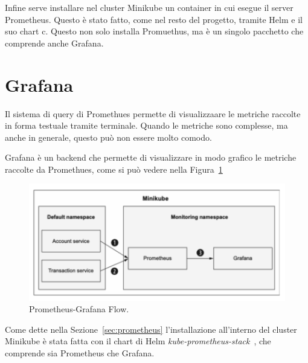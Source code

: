 Infine serve installare nel cluster Minikube un container in cui esegue il server Prometheus. Questo è stato fatto, come nel resto del progetto, tramite Helm e il suo chart c. Questo non solo installa Promuethus, ma è un singolo pacchetto che comprende anche Grafana.

\section{Grafana}
Il sistema di query di Promethues permette di visualizzaare le metriche raccolte in forma testuale tramite terminale. Quando le metriche sono complesse, ma anche in generale, questo può non essere molto comodo.

Grafana è un backend che permette di visualizzare in modo grafico le metriche raccolte da Promethues, come si può vedere nella Figura~\ref{fig:pr_gr_flow}
\begin{figure}[htbp]
    \centering
    \includegraphics[width=.7\textwidth]{images/5-metrics/prom graf flow.pdf}
    \caption{Prometheus-Grafana Flow.}
    \label{fig:pr_gr_flow}
\end{figure}

Come dette nella Sezione~\ref{sec:prometheus} l'installazione all'interno del cluster Minikube è stata fatta con il chart di Helm \textit{kube-prometheus-stack}~\cite{prometheus_stack}, che comprende sia Prometheus che Grafana.